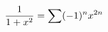 \documentclass[preview]{standalone}
\begin{document}
\begin{align*}
\special{dvisvgm:raw <g id='unique000'>}\dfrac{1}{1+x^2}=\sum(-1)^nx^{2n}\special{dvisvgm:raw </g>}
\end{align*}
\end{document}
